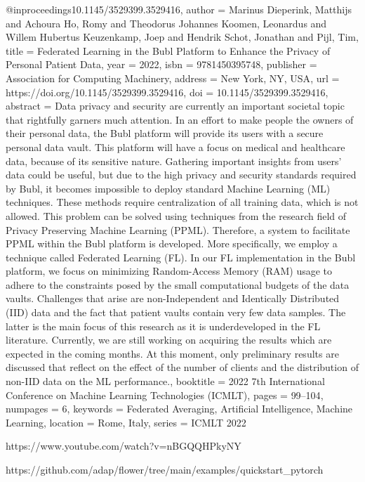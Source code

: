 @inproceedings{10.1145/3529399.3529416,
author = {Marinus Dieperink, Matthijs and Achoura Ho, Romy and Theodorus Johannes Koomen, Leonardus and Willem Hubertus Keuzenkamp, Joep and Hendrik Schot, Jonathan and Pijl, Tim},
title = {Federated Learning in the Bubl Platform to Enhance the Privacy of Personal Patient Data},
year = {2022},
isbn = {9781450395748},
publisher = {Association for Computing Machinery},
address = {New York, NY, USA},
url = {https://doi.org/10.1145/3529399.3529416},
doi = {10.1145/3529399.3529416},
abstract = {Data privacy and security are currently an important societal topic that rightfully garners much attention. In an effort to make people the owners of their personal data, the Bubl platform will provide its users with a secure personal data vault. This platform will have a focus on medical and healthcare data, because of its sensitive nature. Gathering important insights from users’ data could be useful, but due to the high privacy and security standards required by Bubl, it becomes impossible to deploy standard Machine Learning (ML) techniques. These methods require centralization of all training data, which is not allowed. This problem can be solved using techniques from the research field of Privacy Preserving Machine Learning (PPML). Therefore, a system to facilitate PPML within the Bubl platform is developed. More specifically, we employ a technique called Federated Learning (FL). In our FL implementation in the Bubl platform, we focus on minimizing Random-Access Memory (RAM) usage to adhere to the constraints posed by the small computational budgets of the data vaults. Challenges that arise are non-Independent and Identically Distributed (IID) data and the fact that patient vaults contain very few data samples. The latter is the main focus of this research as it is underdeveloped in the FL literature. Currently, we are still working on acquiring the results which are expected in the coming months. At this moment, only preliminary results are discussed that reflect on the effect of the number of clients and the distribution of non-IID data on the ML performance.},
booktitle = {2022 7th International Conference on Machine Learning Technologies (ICMLT)},
pages = {99–104},
numpages = {6},
keywords = {Federated Averaging, Artificial Intelligence, Machine Learning},
location = {Rome, Italy},
series = {ICMLT 2022}
}

https://www.youtube.com/watch?v=nBGQQHPkyNY

https://github.com/adap/flower/tree/main/examples/quickstart_pytorch
